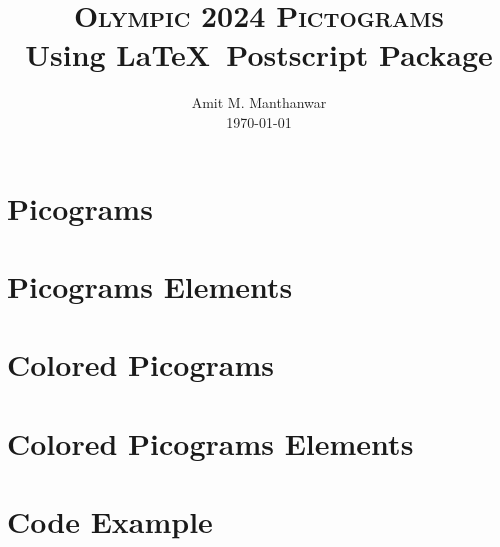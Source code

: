 \documentclass{pst-icon}
\title{\Huge\textsc{Olympic 2024 Pictograms}\\[2mm]
\LARGE{Using \LaTeX\ Postscript Package
\textsf{\text{pst-icon-sports-olympic-2024}}}\\[-2mm]
}
\author{\small{Amit M. Manthanwar}\\[0mm]\footnotesize{\today}}
\date{}
\begin{document}
\maketitle





\section{Picograms}


\clearpage
\section{Picograms Elements}


\clearpage
\section{Colored Picograms}


\clearpage
\section{Colored Picograms Elements}


\clearpage
\section{Code Example}
\end{document}

